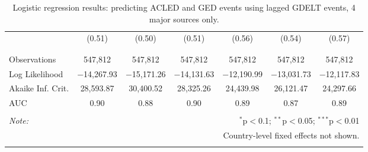 \documentclass[hidelinks]{article}
\begin{document}
\begin{table}[!htbp]
\begin{footnotesize}
\begin{tabular}{@{\extracolsep{5pt}}lcccccc}
  & (0.51) & (0.50) & (0.51) & (0.56) & (0.54) & (0.57) \\ 
  & & & & & & \\ 
\hline \\[-1.8ex] 
Observations & 547,812 & 547,812 & 547,812 & 547,812 & 547,812 & 547,812 \\ 
Log Likelihood & $-$14,267.93 & $-$15,171.26 & $-$14,131.63 & $-$12,190.99 & $-$13,031.73 & $-$12,117.83 \\ 
Akaike Inf. Crit. & 28,593.87 & 30,400.52 & 28,325.26 & 24,439.98 & 26,121.47 & 24,297.66 \\ 
AUC 		& 0.90 & 0.88 & 0.90 & 0.89 & 0.87 & 0.89\\
\hline 
\hline 
\hline \\[-1.8ex] 
\textit{Note:}  & \multicolumn{6}{r}{$^{*}$p$<$0.1; $^{**}$p$<$0.05; $^{***}$p$<$0.01} \\ 
			& \multicolumn{6}{r}{Country-level fixed effects not shown.} \\ 
\normalsize 
\end{tabular} 
\end{footnotesize}
\caption{Logistic regression results: predicting ACLED and GED events using lagged GDELT events, 4 major sources only.}\label{tab:regression2} 
\end{table} 









\nocite{*} 


\end{document}

